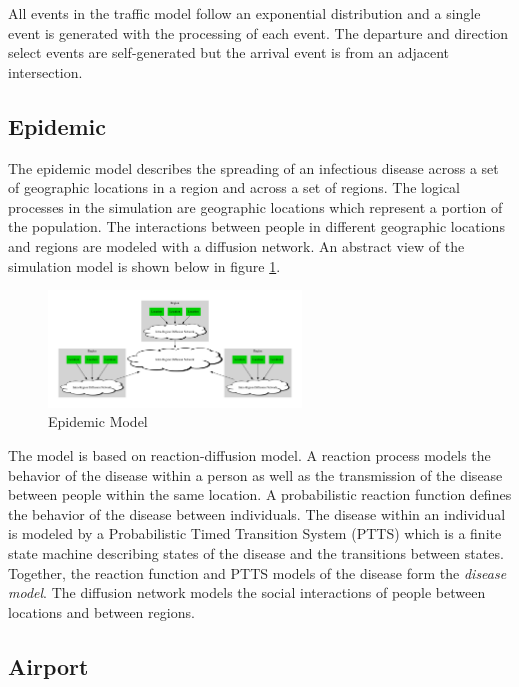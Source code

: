\documentclass[11pt]{book}
\begin{document}
All events in the traffic model follow an exponential distribution and a single event
is generated with the processing of each event. The departure and direction select events
are self-generated but the arrival event is from an adjacent intersection.

\subsection{Epidemic}

The epidemic model describes the spreading of an infectious disease across a set of
geographic locations in a region and across a set of regions. The logical processes in
the simulation are geographic locations which represent a portion of the population. The
interactions between people in different geographic locations and regions are modeled with
a diffusion network. An abstract view of the simulation model is shown below in figure
\ref{epidemic_model}.

\begin{figure}
    \centering
    \includegraphics[width=0.6\textwidth,quiet]{figs/graphviz/epidemic.pdf}
    \caption{Epidemic Model}\label{epidemic_model}
\end{figure}

The model is based on reaction-diffusion model\cite{perumalla-12}. A reaction process
models the behavior of the disease within a person as well as the transmission of the
disease between people within the same location. A probabilistic reaction function defines
the behavior of the disease between individuals\cite{barrett-08}. The disease within an
individual is modeled by a Probabilistic Timed Transition System (PTTS)\cite{barrett-08}
which is a finite state machine describing states of the disease and the transitions between states.
Together, the reaction function and PTTS models of the disease form the \emph{disease model}.
The diffusion network models the social interactions of people between locations and between
regions\cite{barrett-08}.

\subsection{Airport}
\end{document}
